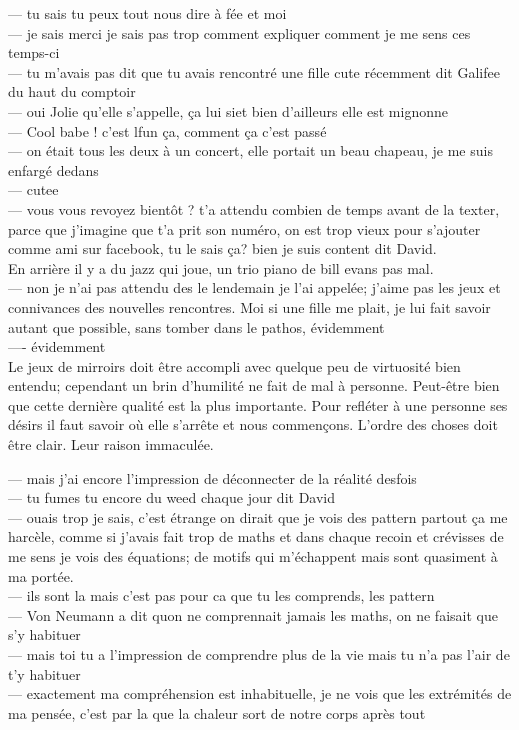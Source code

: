 \documentclass{article}
\begin{document}
--- tu sais tu peux tout nous dire à fée et moi \\
--- je sais merci je sais pas trop comment expliquer comment je me sens ces temps-ci\\
--- tu m'avais pas dit que tu avais rencontré une fille cute récemment dit Galifee du
haut du comptoir\\
--- oui Jolie qu'elle s'appelle, ça lui siet bien d'ailleurs elle est mignonne\\
--- Cool babe ! c'est lfun ça, comment ça c'est passé\\
--- on était tous les deux à un concert, elle portait un beau chapeau, je me suis enfargé dedans\\
--- cutee\\
--- vous vous revoyez bientôt ? t'a attendu combien de temps avant de la texter,
parce que j'imagine que t'a prit son numéro, on est trop vieux pour s'ajouter comme ami
sur facebook, tu le sais ça? bien je suis content dit David.  \\

En arrière il y a du jazz qui joue, un trio piano de bill evans pas mal.\\

--- non je n'ai pas attendu des le lendemain je l'ai appelée; j'aime pas les
jeux et connivances des nouvelles rencontres. Moi si une fille me plait, je lui
fait savoir autant que possible, sans tomber dans le pathos, évidemment\\
---- évidemment\\


Le jeux de mirroirs doit être accompli avec quelque peu de virtuosité bien
entendu; cependant un brin d'humilité ne fait de mal à personne. Peut-être
bien que cette dernière qualité est la plus importante. Pour refléter à une personne
ses désirs il faut savoir où elle s'arrête et nous commençons. L'ordre des choses
doit être clair. Leur raison immaculée.


--- mais j'ai encore l'impression de déconnecter de la réalité desfois\\
--- tu fumes tu encore du weed chaque jour dit David\\
--- ouais trop je sais, c'est étrange on dirait que je vois des pattern partout ça me harcèle,
comme si j'avais fait trop de maths et dans chaque recoin et crévisses de me sens je vois des équations;
de motifs qui m'échappent mais sont quasiment à ma portée.\\
--- ils sont la mais c'est pas pour ca que tu les comprends, les pattern \\
--- Von Neumann a dit quon ne comprennait jamais les maths, on ne faisait que s'y habituer\\
--- mais toi tu a l'impression de comprendre plus de la vie mais tu n'a pas l'air de t'y habituer\\
--- exactement ma compréhension est inhabituelle, je ne vois que les extrémités de ma pensée,
c'est par la que la chaleur sort de notre corps après tout\\
\end{document}
